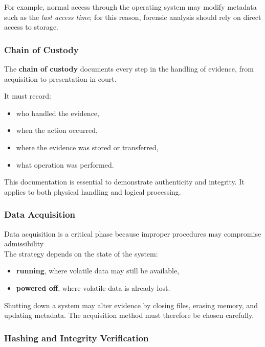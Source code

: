 \noindent
For example, normal access through the operating system may modify metadata such as the \textit{last access time}; for this reason, forensic analysis should rely on direct access to storage.

\subsubsection{Chain of Custody}

The \textbf{chain of custody} documents every step in the handling of evidence, from acquisition to presentation in court.

It must record:

\begin{itemize}
\item who handled the evidence,
\item when the action occurred,
\item where the evidence was stored or transferred,
\item what operation was performed.
\end{itemize}

\noindent
This documentation is essential to demonstrate authenticity and integrity. It applies to both physical handling and logical processing.

\subsubsection{Data Acquisition}

Data acquisition is a critical phase because improper procedures may compromise admissibility
\\
The strategy depends on the state of the system:

\begin{itemize}
\item \textbf{running}, where volatile data may still be available,
\item \textbf{powered off}, where volatile data is already lost.
\end{itemize}

\noindent
Shutting down a system may alter evidence by closing files, erasing memory, and updating metadata. The acquisition method must therefore be chosen carefully.

\subsubsection{Hashing and Integrity Verification}

